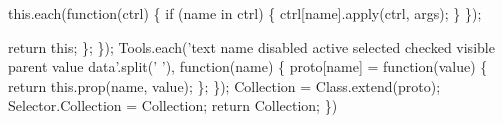 \begin{DoxyCompactItemize}
{			this.\+each(function(ctrl) \{
				if (name in ctrl) \{
					ctrl\mbox{[}name\mbox{]}.\+apply(ctrl, args);
				\}
			\});

			return this;
		\};
	\});  Tools.\+each('text name disabled active selected checked visible parent value data'.\+split(' '), function(name) \{
		proto\mbox{[}name\mbox{]} = function(value) \{
			return this.\+prop(name, value);
		\};
	\});  Collection = Class.\+extend(proto);  Selector.\+Collection = Collection; return Collection; \})}
\end{DoxyCompactItemize}
